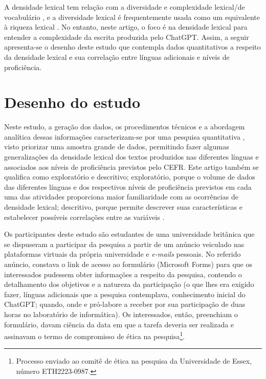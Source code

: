 \documentclass[portuguese]{textolivre}
\begin{document}
A densidade lexical tem relação com a diversidade e complexidade lexical/de vocabulário \cite{martins_densidade_2017,gonzalez_fernandez_big_2018,riffo_descripcion_2019}, e a diversidade lexical é frequentemente usada como um equivalente à riqueza lexical \cite{johansson_lexical_2008}. No entanto, neste artigo, o foco é na densidade lexical para entender a complexidade da escrita produzida pelo ChatGPT. Assim, a seguir apresenta-se o desenho deste estudo que contempla dados quantitativos a respeito da densidade lexical e sua correlação entre línguas adicionais e níveis de proficiência.

\section{Desenho do estudo}\label{sec-conduta}
Neste estudo, a geração dos dados, os procedimentos técnicos e a abordagem analítica dessas informações caracterizam-se por uma pesquisa quantitativa \cite{dornyei_research_2007}, visto priorizar uma amostra grande de dados, permitindo fazer algumas generalizações da densidade lexical dos textos produzidos nas diferentes línguas e associados aos níveis de proficiência previstos pelo CEFR. Este artigo também se qualifica como exploratório e descritivo; exploratório, porque o volume de dados das diferentes línguas e dos respectivos níveis de proficiência previstos em cada uma das atividades proporciona maior familiaridade com as ocorrências de densidade lexical; descritivo, porque permite descrever suas características e estabelecer possíveis correlações entre as variáveis \cite{gil_como_2002}.

Os participantes deste estudo são estudantes de uma universidade britânica que se dispuseram a participar da pesquisa a partir de um anúncio veiculado nas plataformas virtuais da própria universidade e \textit{e-mails} pessoais. No referido anúncio, constava o link de acesso ao formulário (Microsoft Forms) para que os interessados pudessem obter informações a respeito da pesquisa, contendo o detalhamento dos objetivos e a natureza da participação (o que lhes era exigido fazer, línguas adicionais que a pesquisa contemplava, conhecimento inicial do ChatGPT; quando, onde e pró-labore a receber por sua participação de duas horas no laboratório de informática). Os interessados, então, preenchiam o formulário, davam ciência da data em que a tarefa deveria ser realizada e assinavam o termo de compromisso de ética na pesquisa\footnote{Processo enviado ao comitê de ética na pesquisa da Universidade de Essex, número ETH2223-0987.}.
\end{document}
